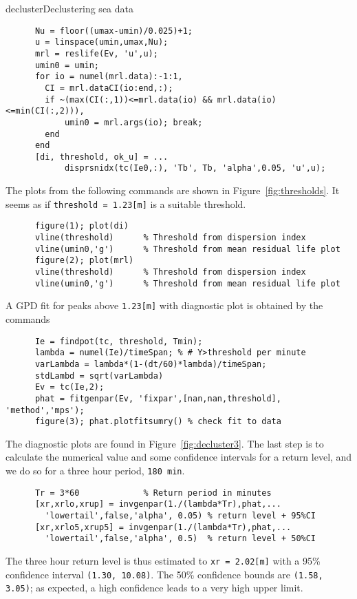 \begin{rtex}{decluster}{Declustering sea data}
{\small\begin{verbatim}
      Nu = floor((umax-umin)/0.025)+1;
      u = linspace(umin,umax,Nu);
      mrl = reslife(Ev, 'u',u);
      umin0 = umin;
      for io = numel(mrl.data):-1:1,
        CI = mrl.dataCI(io:end,:);
        if ~(max(CI(:,1))<=mrl.data(io) && mrl.data(io)<=min(CI(:,2))),
            umin0 = mrl.args(io); break;
        end
      end
      [di, threshold, ok_u] = ...
            disprsnidx(tc(Ie0,:), 'Tb', Tb, 'alpha',0.05, 'u',u);
\end{verbatim}} 
The plots from the following commands are shown in Figure~\ref{fig:thresholds}.
It seems as if {\tt threshold = 1.23[m]} is a suitable threshold.
{\small\begin{verbatim}
      figure(1); plot(di)
      vline(threshold)      % Threshold from dispersion index
      vline(umin0,'g')      % Threshold from mean residual life plot
      figure(2); plot(mrl)
      vline(threshold)      % Threshold from dispersion index
      vline(umin0,'g')      % Threshold from mean residual life plot
\end{verbatim}}
A GPD fit for peaks above {\tt 1.23[m]} with diagnostic
plot is obtained by the  commands
{\small\begin{verbatim}
      Ie = findpot(tc, threshold, Tmin);
      lambda = numel(Ie)/timeSpan; % # Y>threshold per minute
      varLambda = lambda*(1-(dt/60)*lambda)/timeSpan;
      stdLambd = sqrt(varLambda)
      Ev = tc(Ie,2);
      phat = fitgenpar(Ev, 'fixpar',[nan,nan,threshold], 'method','mps');
      figure(3); phat.plotfitsumry() % check fit to data
\end{verbatim}}
The diagnostic plots are found in Figure~\ref{fig:decluster3}.
The last step is to calculate the numerical value and some confidence
intervals for a return level, and we do so for a three
hour period, {\tt 180 min}.
{\small\begin{verbatim}
      Tr = 3*60             % Return period in minutes
      [xr,xrlo,xrup] = invgenpar(1./(lambda*Tr),phat,...
        'lowertail',false,'alpha', 0.05) % return level + 95%CI
      [xr,xrlo5,xrup5] = invgenpar(1./(lambda*Tr),phat,...
        'lowertail',false,'alpha', 0.5)  % return level + 50%CI
\end{verbatim}} 
The three hour return level is thus estimated to
{\tt xr = 2.02[m]} with a 95\% confidence interval
{\tt (1.30, 10.08)}. The 50\% confidence bounds are 
{\tt (1.58, 3.05)};
as expected, a high confidence leads to a very high upper limit.
\end{rtex}

